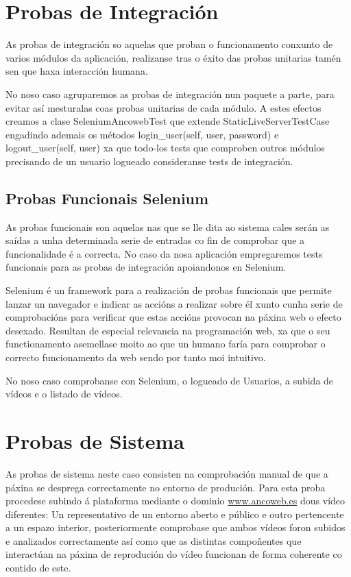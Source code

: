 \section{Probas de Integración}

    As probas de integración so aquelas que proban o funcionamento conxunto de varios módulos da 
    aplicación, realizanse tras o éxito das probas unitarias tamén sen que haxa interacción humana.
    
    No noso caso agruparemos as probas de integración nun paquete a parte, para evitar así 
    mesturalas coas probas unitarias de cada módulo. A estes efectos creamos a clase SeleniumAncowebTest
    que extende StaticLiveServerTestCase engadindo ademais os métodos login\_user(self, user, 
    password) e logout\_user(self, user) xa que todo-los tests que comproben outros módulos precisando
    de un usuario logueado consideranse tests de integración.

    \subsection{Probas Funcionais Selenium}

        As probas funcionais son aquelas nas que se lle dita ao sistema cales serán as saídas a unha 
        determinada serie de entradas co fin de comprobar que a funcionalidade é a correcta. No caso da
        nosa aplicación empregaremos tests funcionais para as probas de integración apoiandonos en Selenium.
        
        Selenium é un framework para a realización de probas funcionais que permite lanzar un navegador
        e indicar as accións a realizar sobre él xunto cunha serie de comprobacións para verificar que
        estas accións provocan na páxina web o efecto desexado. Resultan de especial relevancia na 
        programación web, xa que o seu functionamento asemellase moito ao que un humano faría para 
        comprobar o correcto funcionamento da web sendo por tanto moi intuitivo.
        
        No noso caso comprobanse con Selenium, o logueado de Usuarios, a subida de vídeos e o listado de
        vídeos.
    
\section{Probas de Sistema}
    As probas de sistema neste caso consisten na comprobación manual de que a páxina se desprega 
    correctamente no entorno de produción. Para esta proba procedese subindo á plataforma mediante 
    o dominio \url{www.ancoweb.es} dous vídeo diferentes: Un representativo de un entorno aberto e público
    e outro pertencente a un espazo interior, posteriormente comprobase que ambos vídeos foron
    subidos e analizados correctamente así como que as distintas compoñentes que interactúan na 
    páxina de reprodución do vídeo funcionan de forma coherente co contido de este. 

